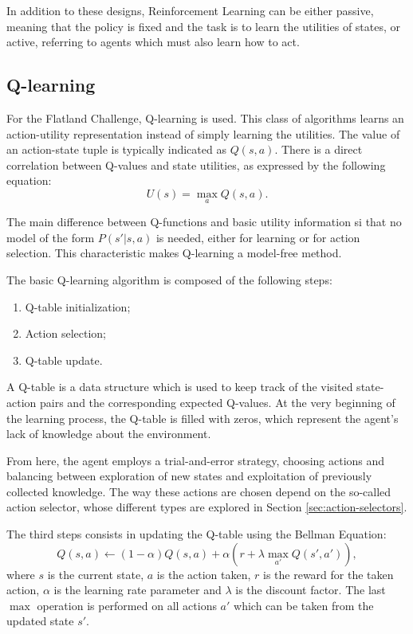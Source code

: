 \documentclass[a4paper, 12pt]{article}
\numberwithin{equation}{section}
\begin{document}
In addition to these designs, Reinforcement Learning can be either passive, meaning that the policy is fixed and the task is to learn the utilities of states, or active, referring to agents which must also learn how to act.

\subsection[Q-learning]{Q-learning \cite{dqn-tutorial}}

For the Flatland Challenge, Q-learning is used. This class of algorithms learns an action-utility representation instead of simply learning the utilities. The value of an action-state tuple is typically indicated as $Q\left(s,a\right)$. There is a direct correlation between Q-values and state utilities, as expressed by the following equation:
\begin{equation}
	U\left(s\right) = \max_a Q\left(s,a\right).
\end{equation}

The main difference between Q-functions and basic utility information si that no model of the form $P\left(s'|s,a\right)$ is needed, either for learning or for action selection. This characteristic makes Q-learning a model-free method.

The basic Q-learning algorithm is composed of the following steps:
\begin{enumerate}
	\item Q-table initialization;
	\item Action selection;
	\item Q-table update.
\end{enumerate}


A Q-table is a data structure which is used to keep track of the visited state-action pairs and the corresponding expected Q-values. At the very beginning of the learning process, the Q-table is filled with zeros, which represent the agent's lack of knowledge about the environment.

From here, the agent employs a trial-and-error strategy, choosing actions and balancing between exploration of new states and exploitation of previously collected knowledge. The way these actions are chosen depend on the so-called action selector, whose different types are explored in Section \ref{sec:action-selectors}.


The third steps consists in updating the Q-table using the Bellman Equation:
\begin{equation}\label{eq:bellman}
	Q\left(s,a\right)\leftarrow \left(1-\alpha\right)Q\left(s,a\right)+\alpha\left(r+\lambda\max_{a'}Q\left(s',a'\right)\right),
\end{equation}
where $s$ is the current state, $a$ is the action taken, $r$ is the reward for the taken action, $\alpha$ is the learning rate parameter and $\lambda$ is the discount factor. The last $\max$ operation is performed on all actions $a'$ which can be taken from the updated state $s'$.
\end{document}
